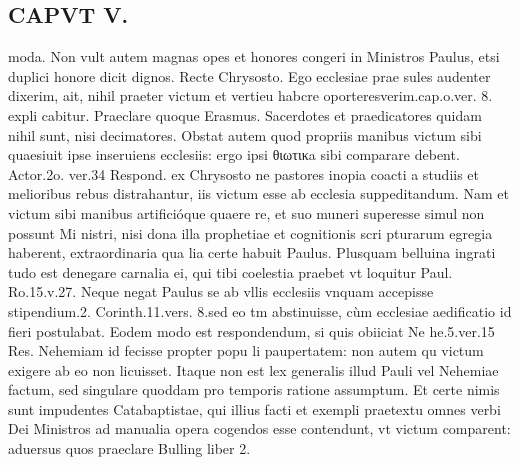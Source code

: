 \documentclass{article}
\begin{document}
\begin{pages}
\section*{CAPVT  V. }
\marginpar{[ p.307 ]}\pstart moda. Non vult autem magnas opes et honores congeri in Ministros Paulus, etsi duplici honore dicit dignos. Recte Chrysosto. Ego ecclesiae prae sules audenter dixerim, ait, nihil praeter victum et vertieu habcre oporteresverim.cap.o.ver. 8. expli cabitur. Praeclare quoque Erasmus. Sacerdotes et praedicatores quidam nihil sunt, nisi decimatores.  \pend\pstart Obstat autem quod propriis manibus victum sibi quaesiuit ipse inseruiens ecclesiis: ergo ipsi θιωτικa sibi comparare debent. Actor.2o. ver.34 Respond. ex Chrysosto ne pastores inopia coacti a studiis et melioribus rebus distrahantur, iis victum esse ab ecclesia suppeditandum. Nam et victum sibi manibus artificióque quaere re, et suo muneri superesse simul non possunt Mi nistri, nisi dona illa prophetiae et cognitionis scri pturarum egregia haberent, extraordinaria qua lia certe habuit Paulus. Plusquam belluina ingrati tudo est denegare carnalia ei, qui tibi coelestia praebet vt loquitur Paul. Ro.15.v.27. Neque negat Paulus se ab vllis ecclesiis vnquam accepisse stipendium.2. Corinth.11.vers. 8.sed eo tm abstinuisse, cùm ecclesiae aedificatio id fieri postulabat. Eodem modo est respondendum, si quis obiiciat Ne he.5.ver.15 Res. Nehemiam id fecisse propter popu li paupertatem: non autem qu victum exigere ab eo non licuisset. Itaque  non est lex generalis illud Pauli vel Nehemiae factum, sed singulare quoddam pro temporis ratione assumptum. Et certe nimis sunt impudentes Catabaptistae, qui illius facti et exempli praetextu omnes verbi Dei Ministros ad manualia opera cogendos esse contendunt, vt victum comparent: aduersus quos praeclare Bulling liber 2.  \pend

\end{pages}
\end{document}
